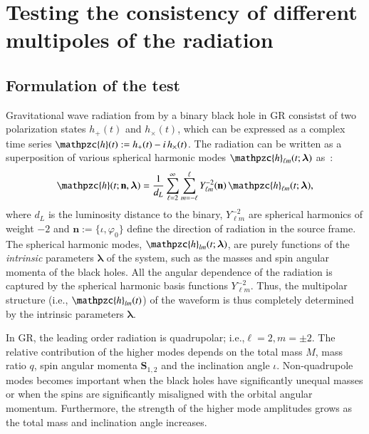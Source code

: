 \documentclass[prd,preprintnumbers,twocolumn,eqsecnum,floatfix,a4paper,nofootinbib,superscriptaddress]{revtex4}
\newcommand{\h}{\mathpzc{h}}
\newcommand{\hlm}{\mathpzc{h}_{\ell m}}
\newcommand{\Ylm}{{Y}^{-2}_{\ell m}}
\newcommand{\blambda}{\bm{\lambda}}
\newcommand{\n}{\mathbf{n}}
\begin{document}
\section{Testing the consistency of different multipoles of the radiation}

\subsection{Formulation of the test}

Gravitational wave radiation from by a binary black hole in GR consistst of two polarization states  $h_+(t)$ and $h_\times(t)$, which can be expressed as a complex time series $\h(t) := h_+(t) - i \, h_\times(t)$. The radiation can be written as a superposition of various spherical harmonic modes ${\h}_{\ell m}(t; \blambda)$ as~\cite{NewmanPenrose}:
\begin{equation} 
\h(t; \n, \blambda)= \frac{1}{d_L} \sum _{\ell=2}^{\infty} \sum _{m=-\ell}^{\ell} {\Ylm} (\n) \, {{\hlm}(t; {\blambda})}, 
\label{eq:spherical_harmonics}
\end{equation}
where $d_L$ is the luminosity distance to the binary, ${\Ylm}$ are spherical harmonics of weight $-2$ and $\n := \{\iota, \varphi_0\}$ define the direction of radiation in the source frame. The spherical harmonic modes, ${\h}_{lm}(t; \blambda)$, are purely functions of the \emph{intrinsic} parameters $\blambda$ of the system, such as the masses and spin angular momenta of the black holes. All the angular dependence of the radiation is captured by the spherical harmonic basis functions ${\Ylm}$. Thus, the multipolar structure (i.e., ${\h}_{lm}(t)$) of the waveform  is thus completely determined by the intrinsic parameters $\blambda$. 

 In GR, the leading order radiation is quadrupolar; i.e.,$\ell = 2, m = \pm 2$. The relative contribution of the higher modes depends on the total mass $M$, mass ratio $q$, spin angular momenta ${\mathbf S}_{1,2}$ and the inclination angle $\iota$.  Non-quadrupole modes becomes important when the black holes have  significantly unequal masses or when the spins are significantly misaligned with the orbital angular momentum. Furthermore, the strength of the higher mode amplitudes grows as the total mass and inclination angle increases. 
\end{document}
